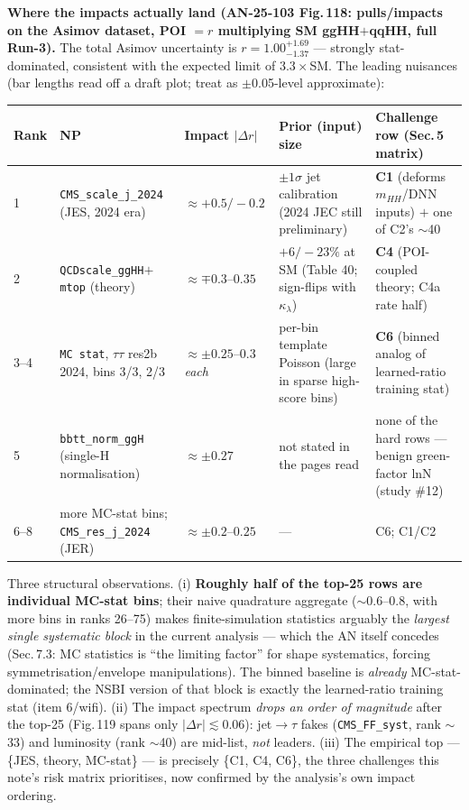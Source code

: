 \documentclass[11pt]{article}
\newcommand{\kl}{\ensuremath{\kappa_\lambda}}
\newcommand{\mhh}{\ensuremath{m_{HH}}}
\begin{document}
\medskip\noindent\textbf{Where the impacts actually land (AN-25-103 Fig.\,118: pulls/impacts on the Asimov
dataset, POI $=r$ multiplying SM ggHH$+$qqHH, full Run-3).} The total Asimov uncertainty is
$r=1.00^{+1.69}_{-1.37}$ --- strongly stat-dominated, consistent with the expected limit of $3.3\times$SM. The
leading nuisances (bar lengths read off a draft plot; treat as $\pm$0.05-level approximate):

\begin{table}[h]\centering\footnotesize
\begin{tabular}{@{}p{}p{}p{}p{}p{}@{}}
\toprule
\textbf{Rank} & \textbf{NP} & \textbf{Impact $|\Delta r|$} & \textbf{Prior (input) size} & \textbf{Challenge row (Sec.\,5 matrix)}\\
\midrule
1 & \texttt{CMS\_scale\_j\_2024} (JES, 2024 era) & $\approx{+}0.5/{-}0.2$ & $\pm1\sigma$ jet calibration (2024 JEC still preliminary) & \textbf{C1} (deforms \mhh/DNN inputs) $+$ one of C2's $\sim$40\\
2 & \texttt{QCDscale\_ggHH$+$mtop} (theory) & $\approx\mp0.3$--$0.35$ & $+6/-23\%$ at SM (Table 40; sign-flips with \kl) & \textbf{C4} (POI-coupled theory; C4a rate half)\\
3--4 & \texttt{MC stat}, $\tau\tau$ res2b 2024, bins 3/3, 2/3 & $\approx\pm0.25$--$0.3$ \emph{each} & per-bin template Poisson (large in sparse high-score bins) & \textbf{C6} (binned analog of learned-ratio training stat)\\
5 & \texttt{bbtt\_norm\_ggH} (single-H normalisation) & $\approx\pm0.27$ & not stated in the pages read & none of the hard rows --- benign green-factor lnN (study \#12)\\
6--8 & more MC-stat bins; \texttt{CMS\_res\_j\_2024} (JER) & $\approx\pm0.2$--$0.25$ & --- & C6; C1/C2\\
\bottomrule
\end{tabular}
\end{table}

\noindent Three structural observations. (i) \textbf{Roughly half of the top-25 rows are individual MC-stat
bins}; their naive quadrature aggregate ($\sim$0.6--0.8, with more bins in ranks 26--75) makes finite-simulation
statistics arguably the \emph{largest single systematic block} in the current analysis --- which the AN itself
concedes (Sec.\,7.3: MC statistics is ``the limiting factor'' for shape systematics, forcing
symmetrisation/envelope manipulations). The binned baseline is \emph{already} MC-stat-dominated; the NSBI
version of that block is exactly the learned-ratio training stat (item 6/wifi). (ii) The impact spectrum
\emph{drops an order of magnitude} after the top-25 (Fig.\,119 spans only $|\Delta r|\lesssim0.06$): jet$\to\tau$
fakes (\texttt{CMS\_FF\_syst}, rank $\sim$33) and luminosity (rank $\sim$40) are mid-list, \emph{not} leaders.
(iii) The empirical top --- \{JES, theory, MC-stat\} --- is precisely \{C1, C4, C6\}, the three challenges this
note's risk matrix prioritises, now confirmed by the analysis's own impact ordering.
\end{document}
